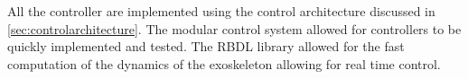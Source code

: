 All the controller are implemented using the control architecture discussed in \autoref{sec:controlarchitecture}. The modular control system allowed for controllers to be quickly implemented and tested. The RBDL library allowed for the fast computation of the dynamics of the exoskeleton allowing for real time control. 





